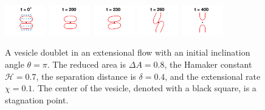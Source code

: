 \documentclass[prf,superscriptaddress,showkeys]{revtex4-1}
\begin{document}
 \begin{figure}
    \includegraphics[width = 0.16\textwidth,trim={4cm 2cm 4cm 1cm},clip]{figs/extensional_adR4em1adS7em1Chi1em1_ra080_image01.png}
  \includegraphics[width = 0.16\textwidth,trim={4cm 2cm 4cm 1cm},clip]{figs/extensional_adR4em1adS7em1Chi1em1_ra080_image02.png}
  \includegraphics[width = 0.16\textwidth,trim={4cm 2cm 4cm 1cm},clip]{figs/extensional_adR4em1adS7em1Chi1em1_ra080_image03.png}
  \includegraphics[width = 0.16\textwidth,trim={4cm 2cm 4cm 1cm},clip]{figs/extensional_adR4em1adS7em1Chi1em1_ra080_image04.png}
  \includegraphics[width = 0.16\textwidth,trim={4cm 2cm 4cm 1cm},clip]{figs/extensional_adR4em1adS7em1Chi1em1_ra080_image05.png}
  \caption{\label{fig:extensional3} A vesicle doublet in an extensional
  flow with an initial inclination angle $\theta=\pi$.  The reduced area
  is $\Delta A = 0.8$, the Hamaker constant $\mathcal{H} = 0.7$, the
  separation distance is $\delta = 0.4$, and the extensional rate $\chi
  = 0.1$.  The center of the vesicle, denoted with a black square, is a
  stagnation point.}
\end{figure}
\end{document}
